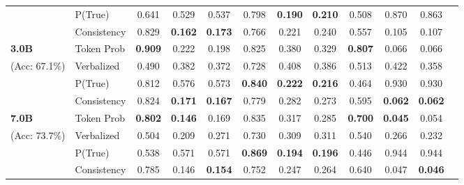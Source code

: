 \documentclass[10pt,twocolumn]{article}
\begin{document}
\begin{table}[t]
\begin{tabular}{llcccccccccc}
& P(True) & 0.641 & 0.529 & 0.537 & 0.798 & \textbf{0.190} & \textbf{0.210} & 0.508 & 0.870 & 0.863 \\
& Consistency & 0.829 & \textbf{0.162} & \textbf{0.173} & 0.766 & 0.221 & 0.240 & 0.557 & 0.105 & 0.107 \\
\midrule
\textbf{3.0B} & Token Prob & \textbf{0.909} & 0.222 & 0.198 & 0.825 & 0.380 & 0.329 & \textbf{0.807} & 0.066 & 0.066 \\
(Acc: 67.1\%) & Verbalized & 0.490 & 0.382 & 0.372 & 0.728 & 0.408 & 0.386 & 0.513 & 0.422 & 0.358 \\
& P(True) & 0.812 & 0.576 & 0.573 & \textbf{0.840} & \textbf{0.222} & \textbf{0.216} & 0.464 & 0.930 & 0.930 \\
& Consistency & 0.824 & \textbf{0.171} & \textbf{0.167} & 0.779 & 0.282 & 0.273 & 0.595 & \textbf{0.062} & \textbf{0.062} \\
\midrule
\textbf{7.0B} & Token Prob & \textbf{0.802} & \textbf{0.146} & 0.169 & 0.835 & 0.317 & 0.285 & \textbf{0.700} & \textbf{0.045} & 0.054 \\
(Acc: 73.7\%) & Verbalized & 0.504 & 0.209 & 0.271 & 0.730 & 0.309 & 0.311 & 0.540 & 0.266 & 0.232 \\
& P(True) & 0.538 & 0.571 & 0.571 & \textbf{0.869} & \textbf{0.194} & \textbf{0.196} & 0.446 & 0.944 & 0.944 \\
& Consistency & 0.785 & 0.146 & \textbf{0.154} & 0.752 & 0.247 & 0.264 & 0.640 & 0.047 & \textbf{0.046} \\
\bottomrule
\end{tabular}
\end{table}
\end{document}
